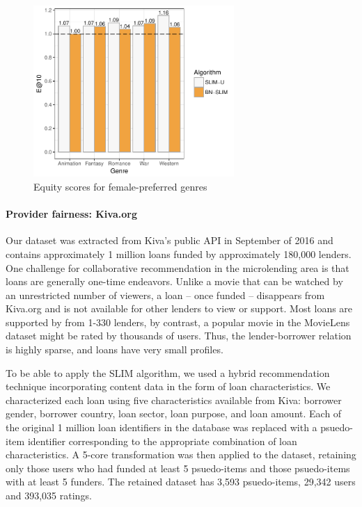 \begin{figure}[bth]
    \centering
    \includegraphics[width=3in]{imgs/bln/inverse-genres3.pdf}
    \caption{Equity scores for female-preferred genres}
    \label{fig:inverse-equity}
\end{figure}

\paragraph{\textbf{Provider fairness: Kiva.org}}
Our dataset was extracted from Kiva's public API in September of 2016 and contains approximately 1 million loans funded by approximately 180,000 lenders. One challenge for collaborative recommendation in the microlending area is that loans are generally one-time endeavors. Unlike a movie that can be watched by an unrestricted number of viewers, a loan -- once funded -- disappears from Kiva.org and is not available for other lenders to view or support. Most loans are supported by from 1-330 lenders, by contrast, a popular movie in the MovieLens dataset might be rated by thousands of users. Thus, the lender-borrower relation is highly sparse, and loans have very small profiles.

To be able to apply the SLIM algorithm, we used a hybrid recommendation technique incorporating content data in the form of loan characteristics. We characterized each loan using five characteristics available from Kiva: borrower gender, borrower country, loan sector, loan purpose, and loan amount. Each of the original 1 million loan identifiers in the database was replaced with a psuedo-item identifier corresponding to the appropriate combination of loan characteristics. A 5-core transformation was then applied to the dataset, retaining only those users who had funded at least 5 psuedo-items and those psuedo-items with at least 5 funders. The retained dataset has 3,593 psuedo-items, 29,342 users and 393,035 ratings.


